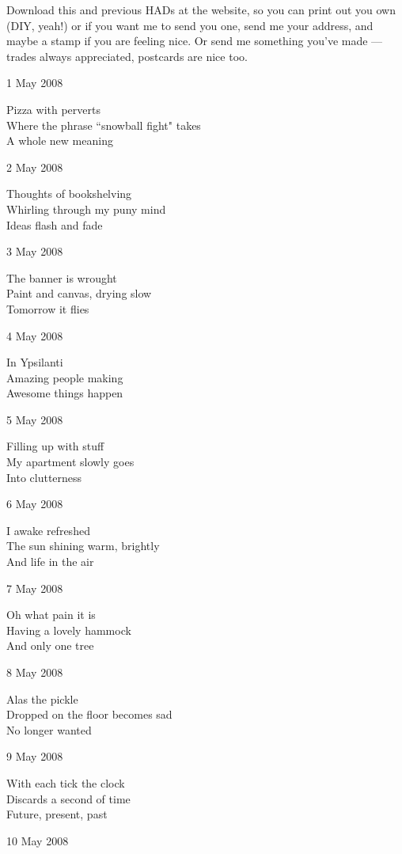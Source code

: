 \documentclass[12pt]{article}
\begin{document}
Download this and previous HADs at the website, so you can
print out you own (DIY, yeah!) or if you want me to send
you one, send me your address, and maybe a stamp if you
are feeling nice. Or send me something you've made ---
trades always appreciated, postcards are nice too.

1 May 2008

Pizza with perverts \\
Where the phrase ``snowball fight" takes \\
A whole new meaning

2 May 2008

Thoughts of bookshelving \\
Whirling through my puny mind \\
Ideas flash and fade

3 May 2008

The banner is wrought \\
Paint and canvas, drying slow \\
Tomorrow it flies 

\newpage

4 May 2008

In Ypsilanti \\
Amazing people making \\
Awesome things happen

5 May 2008

Filling up with stuff \\
My apartment slowly goes \\
Into clutterness

6 May 2008

I awake refreshed \\
The sun shining warm, brightly \\
And life in the air

7 May 2008

Oh what pain it is \\
Having a lovely hammock \\
And only one tree

8 May 2008

Alas the pickle \\
Dropped on the floor becomes sad \\
No longer wanted

9 May 2008

With each tick the clock \\
Discards a second of time \\
Future, present, past

10 May 2008
\end{document}
